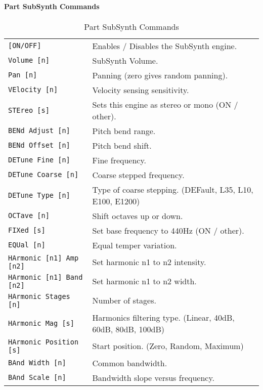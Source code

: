 \paragraph{Part SubSynth Commands}
\label{paragraph:command_line_part_subsynth_commands}

   \begin{table}[H]
      \centering
      \caption{Part SubSynth Commands}
      \label{table:yoshimi_part_subsynth_commands}
      \begin{tabular}{l l}

\texttt{[ON/OFF]} &
   Enables / Disables the SubSynth engine. \\
\texttt{Volume [n]} &
   SubSynth Volume.  \\
\texttt{Pan [n]} &
   Panning (zero gives random panning).\\
\texttt{VElocity [n]} &
   Velocity sensing sensitivity. \\
\texttt{STEreo [s]} &
   Sets this engine as stereo or mono (ON / other). \\
\texttt{BENd Adjust [n]} &
   Pitch bend range. \\
\texttt{BENd Offset [n]} &
   Pitch bend shift. \\
\texttt{DETune Fine [n]} &
   Fine frequency.   \\
\texttt{DETune Coarse [n]} &
   Coarse stepped frequency.  \\
\texttt{DETune Type [n]} &
   Type of coarse stepping. (DEFault, L35, L10, E100, E1200)  \\
\texttt{OCTave [n]} &
   Shift octaves up or down.  \\
\texttt{FIXed [s]} &
   Set base frequency to 440Hz (ON / other).  \\
\texttt{EQUal [n]} &
   Equal temper variation. \\
\texttt{HArmonic [n1] Amp [n2]} &
   Set harmonic n1 to n2 intensity. \\
\texttt{HArmonic [n1] Band [n2]} &
   Set harmonic n1 to n2 width. \\
\texttt{HArmonic Stages [n]} &
   Number of stages. \\
\texttt{HArmonic Mag [s]} &
   Harmonics filtering type. (Linear, 40dB, 60dB, 80dB, 100dB)\\
\texttt{HArmonic Position [s]} &
   Start position. (Zero, Random, Maximum)\\
\texttt{BAnd Width [n]} &
   Common bandwidth. \\
\texttt{BAnd Scale [n]} &
   Bandwidth slope versus frequency. \\

\end{tabular}
\end{table}
